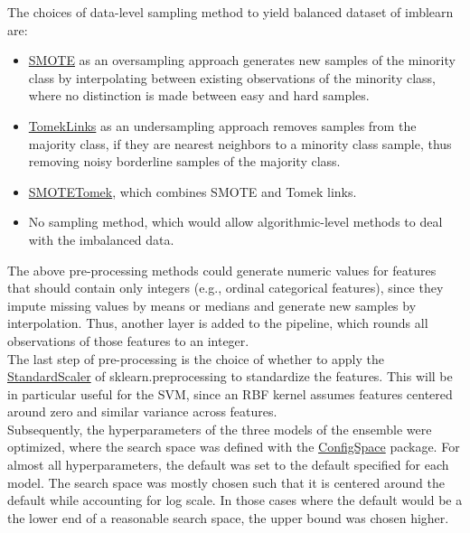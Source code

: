 \documentclass[11pt]{article}
\begin{document}
The choices of data-level sampling method to yield balanced dataset of imblearn are:
\begin{itemize}
\item \href{https://imbalanced-learn.org/stable/references/generated/imblearn.over_sampling.SMOTE.html}{SMOTE} as an oversampling approach generates new samples of the minority class by interpolating between existing observations of the minority class, where no distinction is made between easy and hard samples. 
\item \href{https://imbalanced-learn.org/stable/references/generated/imblearn.under_sampling.TomekLinks.html}{TomekLinks} as an undersampling approach removes samples from the majority class, if they are nearest neighbors to a minority class sample, thus removing noisy borderline samples of the majority class. 
\item \href{https://imbalanced-learn.org/stable/references/generated/imblearn.combine.SMOTETomek.html}{SMOTETomek}, which combines SMOTE and Tomek links.
\item No sampling method, which would allow algorithmic-level methods to deal with the imbalanced data. 
\end{itemize}

The above pre-processing methods could generate numeric values for features that should contain only integers (e.g., ordinal categorical features), since they impute missing values by means or medians and generate new samples by interpolation. Thus, another layer is added to the pipeline, which rounds all observations of those features to an integer. \\

The last step of pre-processing is  the choice of whether to apply the \href{https://scikit-learn.org/stable/modules/generated/sklearn.preprocessing.StandardScaler.html}{StandardScaler} of sklearn.preprocessing to standardize the features. This will be in particular useful for the SVM, since an RBF kernel assumes features centered around zero and similar variance across features. \\

Subsequently, the hyperparameters of the three models of the ensemble were optimized, where the search space was defined with the \href{https://automl.github.io/ConfigSpace/main/}{ConfigSpace} package. For almost all hyperparameters, the default was set to the default specified for each model. The search space was mostly chosen such that it is centered around the default while accounting for log scale. In those cases where the default would be a the lower end of a reasonable search space, the upper bound was chosen higher. \\
\end{document}
